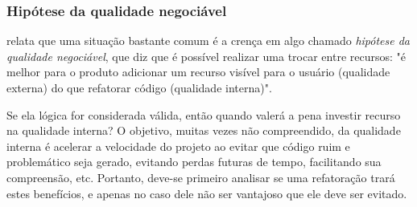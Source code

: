 \documentclass[
	12pt,				%
	openright,			%
	oneside,			%
	a4paper,			%
	english,			%
	brazil,				%
	]{abntex2}
\begin{document}



\subsubsection{Hipótese da qualidade negociável}
 relata que uma situação bastante comum é a crença em algo chamado \emph{hipótese da qualidade negociável}, que diz que é possível realizar uma trocar entre recursos: "é melhor para o produto adicionar um recurso visível para o usuário (qualidade externa) do que refatorar código (qualidade interna)".

Se ela lógica for considerada válida, então quando valerá a pena investir recurso na qualidade interna? O objetivo, muitas vezes não compreendido, da qualidade interna é acelerar a velocidade do projeto ao evitar que código ruim e problemático seja gerado, evitando perdas futuras de tempo, facilitando sua compreensão, etc. Portanto, deve-se primeiro analisar se uma refatoração trará estes benefícios, e apenas no caso dele não ser vantajoso que ele deve ser evitado.




\end{document}
